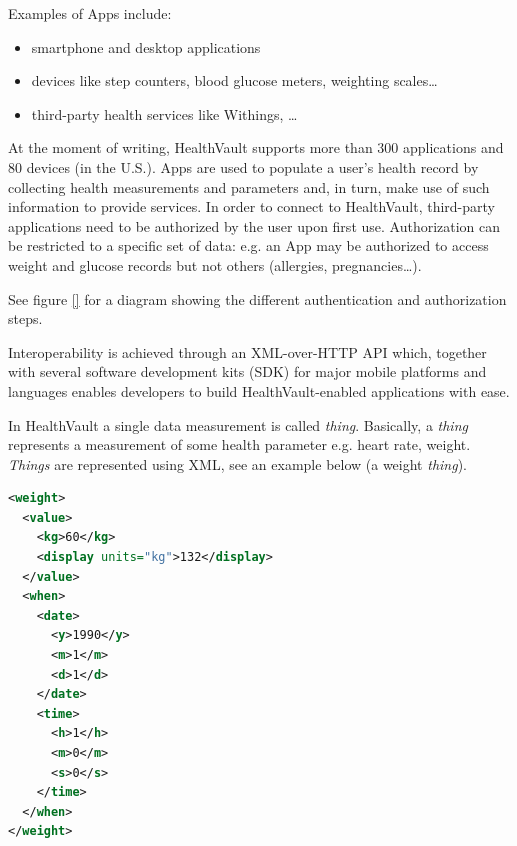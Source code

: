 Examples of Apps include:
\begin{itemize}
\item smartphone and desktop applications
\item devices like step counters, blood glucose meters, weighting scales\ldots
\item third-party health services like Withings, \ldots
\end{itemize}

At the moment of writing, HealthVault supports more than 300 applications and 80 devices (in the U.S.).
Apps are used to populate a user's health record by collecting health measurements and parameters and, in turn, make use of such information to provide services.
In order to connect to HealthVault, third-party applications need to be authorized by the user upon first use. 
Authorization can be restricted to a specific set of data: e.g. an App may be authorized to access weight and glucose records but not others (allergies, pregnancies\ldots).

See figure \ref{} for a diagram showing the different authentication and authorization steps.

Interoperability is achieved through an XML-over-HTTP API which, together with several software development kits (SDK) for major mobile platforms and languages enables developers to build HealthVault-enabled applications with ease.

In HealthVault a single data measurement is called \textit{thing}.
Basically, a \textit{thing} represents a measurement of some health parameter e.g. heart rate, weight.
\textit{Things} are represented using XML, see an example below (a weight \textit{thing}).

\begin{lstlisting}[language=XML]
<weight>
  <value>
    <kg>60</kg>
    <display units="kg">132</display>
  </value>
  <when>
    <date>
      <y>1990</y>
      <m>1</m>
      <d>1</d>
    </date>
    <time>
      <h>1</h>
      <m>0</m>
      <s>0</s>
    </time>
  </when>
</weight>
\end{lstlisting}



